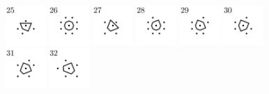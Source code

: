 \documentclass[text.tex]{subfiles}
\begin{document}
\begin{figure}[h!]
\includegraphics[width=0.1363\textwidth]{img/results/octagon_concat/octagon_100000_(1_0alpha_1)_025.pdf}
\includegraphics[width=0.1363\textwidth]{img/results/octagon_concat/octagon_100000_(1_0alpha_1)_026.pdf}
\includegraphics[width=0.1363\textwidth]{img/results/octagon_concat/octagon_100000_(1_0alpha_1)_027.pdf}
\includegraphics[width=0.1363\textwidth]{img/results/octagon_concat/octagon_100000_(1_0alpha_1)_028.pdf}
\includegraphics[width=0.1363\textwidth]{img/results/octagon_concat/octagon_100000_(1_0alpha_1)_029.pdf}
\includegraphics[width=0.1363\textwidth]{img/results/octagon_concat/octagon_100000_(1_0alpha_1)_030.pdf}
\includegraphics[width=0.1363\textwidth]{img/results/octagon_concat/octagon_100000_(1_0alpha_1)_031.pdf}
\includegraphics[width=0.1363\textwidth]{img/results/octagon_concat/octagon_100000_(1_0alpha_1)_032.pdf}

\end{figure}
\end{document}
